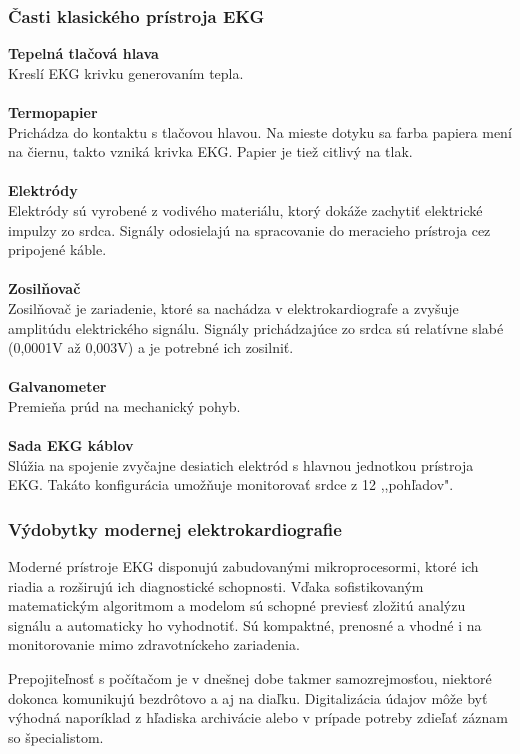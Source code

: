 \documentclass[titlepage,12pt]{article}
\begin{document}
\newpage


\subsubsection{Časti klasického prístroja EKG}

\textbf{Tepelná tlačová hlava}
\\
Kreslí EKG krivku generovaním tepla.
\\
\\
\textbf{Termopapier}
\\
Prichádza do kontaktu s tlačovou hlavou. Na mieste dotyku sa farba papiera mení na čiernu, takto vzniká krivka EKG. Papier je tiež citlivý na tlak.
\\
\\
\textbf{Elektródy}
\\
Elektródy sú vyrobené z vodivého materiálu, ktorý dokáže zachytiť elektrické impulzy zo srdca. Signály odosielajú na spracovanie do meracieho prístroja cez pripojené káble.
\\
\\
\textbf{Zosilňovač}
\\
Zosilňovač je zariadenie, ktoré sa nachádza v elektrokardiografe a zvyšuje amplitúdu elektrického signálu. Signály prichádzajúce zo srdca sú relatívne slabé (0,0001V až 0,003V) a je potrebné ich zosilniť.
\\
\\
\textbf{Galvanometer}
\\
Premieňa prúd na mechanický pohyb.
\\
\\
\textbf{Sada EKG káblov}
\\
Slúžia na spojenie zvyčajne desiatich elektród s hlavnou jednotkou prístroja EKG. Takáto konfigurácia umožňuje monitorovať srdce z 12 ,,pohľadov".

\subsubsection{Výdobytky modernej elektrokardiografie}
Moderné prístroje EKG disponujú zabudovanými mikroprocesormi, ktoré ich riadia a rozširujú ich diagnostické schopnosti. Vďaka sofistikovaným matematickým algoritmom a modelom sú schopné previesť zložitú analýzu signálu a automaticky ho vyhodnotiť. Sú kompaktné, prenosné a vhodné i na monitorovanie mimo zdravotníckeho zariadenia.

Prepojiteľnosť s počítačom je v dnešnej dobe takmer samozrejmosťou, niektoré dokonca komunikujú bezdrôtovo a aj na diaľku. Digitalizácia údajov môže byť výhodná naporíklad z hľadiska archivácie alebo v prípade potreby zdieľať záznam so špecialistom.
\end{document}
